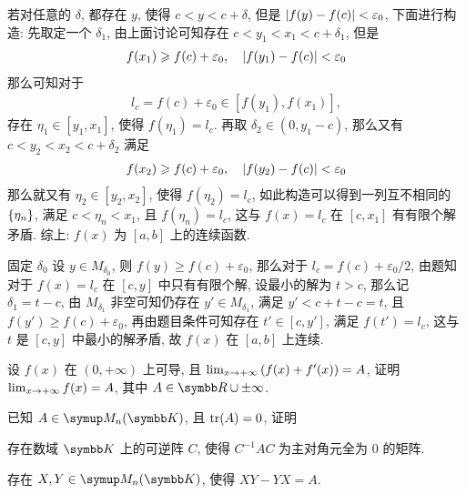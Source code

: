 \begin{exercise}[series=exer]
\begin{answer}
\begin{method}
            若对任意的 $ \delta $, 都存在 $ y $, 使得 $ c < y < c + \delta $, 但是 $ \abs{f(y) - f(c)} < \varepsilon_{0} $, 下面进行构造: 先取定一个 $ \delta_{1} $, 由上面讨论可知存在 $ c < y_{1} < x_{1} < c + \delta_{1}  $, 但是
            \begin{align*}
                f(x_{1}) \geqslant f(c) + \varepsilon_{0}, \quad \abs{f(y_{1}) - f(c)} < \varepsilon_{0}
            \end{align*}
            那么可知对于
            \begin{align*}
                l_{c} = f(c) + \varepsilon_{0} \in [f(y_{1}), f(x_{1})],
            \end{align*}
            存在 $ \eta_{1} \in [y_{1}, x_{1}] $, 使得 $ f(\eta_{1}) = l_{c} $. 再取 $ \delta_{2} \in (0, y_{1} - c) $, 那么又有 $ c < y_{2} < x_{2} < c + \delta_{2} $ 满足
            \begin{align*}
                f(x_{2}) \geqslant f(c) + \varepsilon_{0}, \quad \abs{f(y_{2}) - f(c)} < \varepsilon_{0}
            \end{align*}
            那么就又有 $ \eta_{2} \in [y_{2}, x_{2}] $, 使得 $ f(\eta_{2}) = l_{c} $, 如此构造可以得到一列互不相同的 $ \qty{\eta_{n}} $, 满足 $ c < \eta_{n} < x_{1} $, 且 $ f(\eta_{n}) = l_{c} $, 这与 $ f(x) = l_{c} $ 在 $ [c, x_{1}] $ 有有限个解矛盾. 综上: $ f(x) $ 为 $ [a, b] $ 上的连续函数.
            \item 固定 $ \delta_{0} $ 设 $ y \in M_{\delta_{0}} $, 则 $ f(y) \ge f(c) + \varepsilon_{0} $, 那么对于 $ l_{c} = f(c) + \varepsilon_{0}/2 $, 由题知对于 $ f(x) = l_{c} $ 在 $ [c, y] $ 中只有有限个解, 设最小的解为 $ t > c $, 那么记 $ \delta_{1} = t - c $, 由 $ M_{\delta_{1}} $ 非空可知仍存在 $ y' \in M_{\delta_{1}} $, 满足 $ y' < c + t - c = t $, 且 $ f(y') \ge f(c) + \varepsilon_{0} $, 再由题目条件可知存在 $ t' \in [c, y'] $, 满足 $ f(t') = l_{c} $, 这与 $ t $ 是 $ [c, y] $ 中最小的解矛盾, 故 $ f(x) $ 在 $ [a, b] $ 上连续. 
        \end{method}
    \end{answer}
    \item 设 $ f(x) $ 在 $ (0, +\infty) $ 上可导, 且 $ \lim_{x \to +\infty} \qty(f(x) + f'(x)) = A $, 证明 $ \lim_{x \to +\infty} f(x) = A $, 其中 $ A \in \R\cup{\pm\infty} $. 
    \item 已知 $ A \in \MM[\K] $, 且 $ \tr(A) = 0 $, 证明
    \begin{exercise}
        \item 存在数域 $ \K $ 上的可逆阵 $ C $, 使得 $ C^{-1}AC $ 为主对角元全为 $ 0 $ 的矩阵.
        \item 存在 $ X, Y \in \MM[\K] $, 使得 $ XY - YX = A $.

\end{exercise}
\end{exercise}
